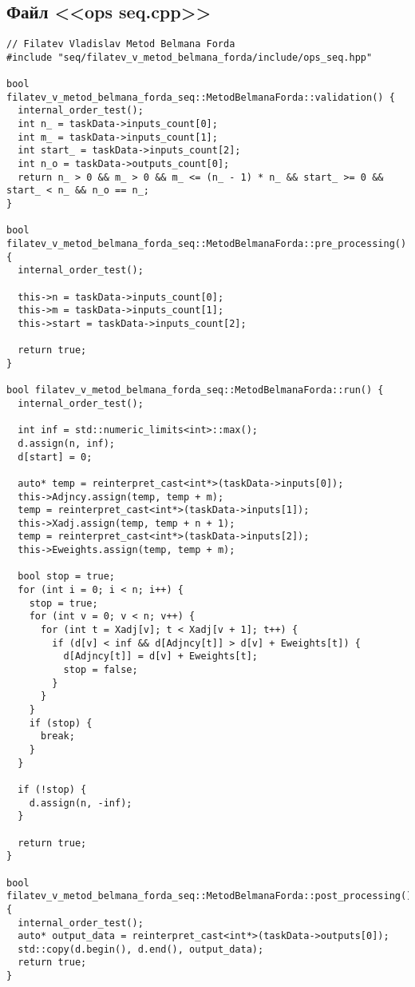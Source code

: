\documentclass[a4paper, 14pt]{article}
\begin{document}
	\subsection*{\centering Файл <<ops seq.cpp>>}
	\begin{verbatim}
// Filatev Vladislav Metod Belmana Forda
#include "seq/filatev_v_metod_belmana_forda/include/ops_seq.hpp"

bool filatev_v_metod_belmana_forda_seq::MetodBelmanaForda::validation() {
  internal_order_test();
  int n_ = taskData->inputs_count[0];
  int m_ = taskData->inputs_count[1];
  int start_ = taskData->inputs_count[2];
  int n_o = taskData->outputs_count[0];
  return n_ > 0 && m_ > 0 && m_ <= (n_ - 1) * n_ && start_ >= 0 && start_ < n_ && n_o == n_;
}

bool filatev_v_metod_belmana_forda_seq::MetodBelmanaForda::pre_processing() {
  internal_order_test();

  this->n = taskData->inputs_count[0];
  this->m = taskData->inputs_count[1];
  this->start = taskData->inputs_count[2];

  return true;
}

bool filatev_v_metod_belmana_forda_seq::MetodBelmanaForda::run() {
  internal_order_test();

  int inf = std::numeric_limits<int>::max();
  d.assign(n, inf);
  d[start] = 0;

  auto* temp = reinterpret_cast<int*>(taskData->inputs[0]);
  this->Adjncy.assign(temp, temp + m);
  temp = reinterpret_cast<int*>(taskData->inputs[1]);
  this->Xadj.assign(temp, temp + n + 1);
  temp = reinterpret_cast<int*>(taskData->inputs[2]);
  this->Eweights.assign(temp, temp + m);

  bool stop = true;
  for (int i = 0; i < n; i++) {
    stop = true;
    for (int v = 0; v < n; v++) {
      for (int t = Xadj[v]; t < Xadj[v + 1]; t++) {
        if (d[v] < inf && d[Adjncy[t]] > d[v] + Eweights[t]) {
          d[Adjncy[t]] = d[v] + Eweights[t];
          stop = false;
        }
      }
    }
    if (stop) {
      break;
    }
  }

  if (!stop) {
    d.assign(n, -inf);
  }

  return true;
}

bool filatev_v_metod_belmana_forda_seq::MetodBelmanaForda::post_processing() {
  internal_order_test();
  auto* output_data = reinterpret_cast<int*>(taskData->outputs[0]);
  std::copy(d.begin(), d.end(), output_data);
  return true;
}
	\end{verbatim}
\end{document}
